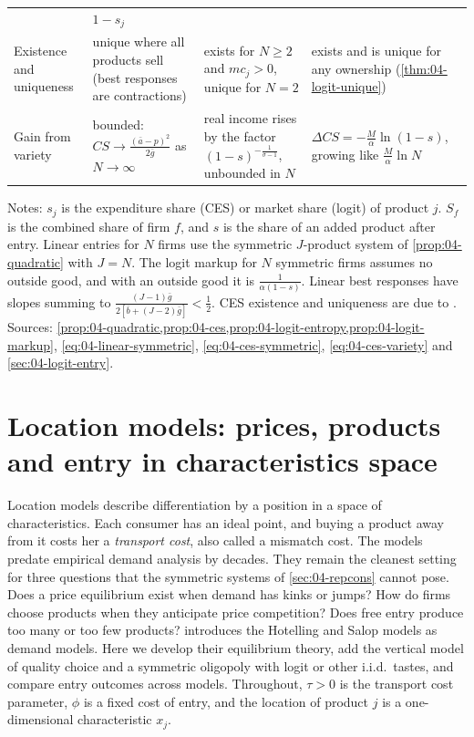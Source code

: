 \begin{table}[htbp]
\begin{tabularx}{\textwidth}{@{}>{\raggedright\arraybackslash}p{2.35cm}>{\raggedright\arraybackslash}X>{\raggedright\arraybackslash}X>{\raggedright\arraybackslash}X@{}}
 & $1 - s_j$ \\
Existence and uniqueness
 & unique where all products sell (best responses are contractions)
 & exists for $N \ge 2$ and $mc_j > 0$, unique for $N = 2$
 & exists and is unique for any ownership (\cref{thm:04-logit-unique}) \\
Gain from variety
 & bounded: $CS \to \frac{(\bar a - p)^2}{2\bar g}$ as $N \to \infty$
 & real income rises by the factor $(1 - s)^{-\frac{1}{\sigma-1}}$, unbounded in $N$
 & $\Delta CS = -\frac{M}{\alpha}\ln(1 - s)$, growing like $\frac{M}{\alpha}\ln N$ \\
\bottomrule
\end{tabularx}
\par\smallskip
\begin{minipage}{\textwidth}
\footnotesize Notes: $s_j$ is the expenditure share (CES) or market share (logit) of product $j$. $S_f$ is the
combined share of firm $f$, and $s$ is the share of an added product after entry. Linear entries for $N$ firms use the
symmetric $J$-product system of \cref{prop:04-quadratic} with $J = N$. The logit markup for $N$ symmetric firms
assumes no outside good, and with an outside good it is $\frac{1}{\alpha(1 - s)}$. Linear best responses have slopes
summing to $\frac{(J-1)\bar g}{2[\bar b + (J-2)\bar g]} < \frac{1}{2}$. CES existence and uniqueness are due to
\citet{CaplinNalebuff1991}. Sources: \cref{prop:04-quadratic,prop:04-ces,prop:04-logit-entropy,prop:04-logit-markup},
\eqref{eq:04-linear-symmetric}, \eqref{eq:04-ces-symmetric}, \eqref{eq:04-ces-variety} and
\cref{sec:04-logit-entry}.
\end{minipage}
\end{table}

\section{Location models: prices, products and entry in characteristics space}\label{sec:04-location}

Location models describe differentiation by a position in a space of characteristics. Each consumer has an ideal
point, and buying a product away from it costs her a \emph{transport cost}, also called a mismatch cost. The models
predate empirical demand analysis by decades. They remain the cleanest setting for three questions that the
symmetric systems of \cref{sec:04-repcons} cannot pose. Does a price equilibrium exist when demand has kinks or
jumps? How do firms choose products when they anticipate price competition? Does free entry produce too many or too
few products?  introduces the Hotelling and Salop models as demand models. Here we develop
their equilibrium theory, add the vertical model of quality choice and a symmetric oligopoly with logit or other
i.i.d.\ tastes, and compare entry outcomes across models. Throughout, $\tau > 0$ is the transport cost parameter, $\phi$ is a fixed cost of entry, and
the location of product $j$ is a one-dimensional characteristic $x_j$.

